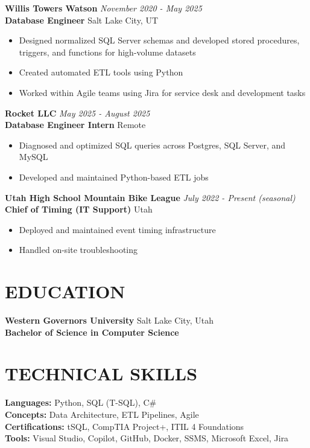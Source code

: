 \documentclass[11pt]{article}
\begin{document}
\textbf{Willis Towers Watson} \hfill \textit{November 2020 - May 2025}\\
\textbf{Database Engineer} \hfill Salt Lake City, UT
\begin{itemize}
    \item Designed normalized SQL Server schemas and developed stored procedures, triggers, and functions for high-volume datasets
    \item Created automated ETL tools using Python
    \item Worked within Agile teams using Jira for service desk and development tasks
\end{itemize}

\textbf{Rocket LLC} \hfill \textit{May 2025 - August 2025}\\
\textbf{Database Engineer Intern} \hfill Remote
\begin{itemize}
    \item Diagnosed and optimized SQL queries across Postgres, SQL Server, and MySQL
    \item Developed and maintained Python-based ETL jobs
\end{itemize}

\textbf{Utah High School Mountain Bike League} \hfill \textit{July 2022 - Present (seasonal)}\\
\textbf{Chief of Timing (IT Support)} \hfill Utah
\begin{itemize}
    \item Deployed and maintained event timing infrastructure
    \item Handled on-site troubleshooting
\end{itemize}

\section*{{\color{accent}EDUCATION}}

\textbf{Western Governors University} \hfill Salt Lake City, Utah\\
\textbf{Bachelor of Science in Computer Science}

\section*{{\color{accent}TECHNICAL SKILLS}}

\textbf{Languages:} Python, SQL (T-SQL), C\#\\
\textbf{Concepts:} Data Architecture, ETL Pipelines, Agile\\
\textbf{Certifications:} tSQL, CompTIA Project+, ITIL 4 Foundations\\
\textbf{Tools:} Visual Studio, Copilot, GitHub, Docker, SSMS, Microsoft Excel, Jira
\end{document}
